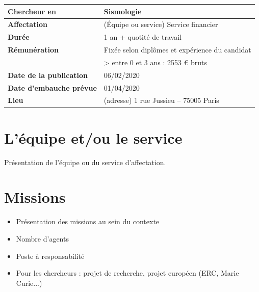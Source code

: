 \documentclass{ipgpoffreemploi}
\begin{document}
\newcommand{\myfoot}{%
Service RH -- Institut de physique du globe de Paris (IPGP) -- UMR 7154 -- 1 rue Jussieu 
-- 75238 Paris Cedex 05 -- France -- www.ipgp.fr}  


\begin{tabularx}{\linewidth}{@{}>{\bfseries\color{IPGPblue}}l@{\hspace*{2cm}}l@{}}
Chercheur en & Sismologie \\ \midrule
Affectation & (Équipe ou service) Service financier\\  \midrule
Durée & 1 an + quotité de travail \\ \midrule
Rémunération & Fixée selon diplômes et expérience du candidat \\ 
& > entre 0 et 3 ans : 2553 \euro{} bruts \\ \midrule
Date de la publication & 06/02/2020\\ \midrule
Date d’embauche prévue & 01/04/2020\\ \midrule
Lieu &  (adresse) 1 rue Jussieu -- 75005 Paris\\ \bottomrule
\end{tabularx}

\presIPGP

\section*{L’équipe et/ou le service}

Présentation de l’équipe ou du service d’affectation.

\section*{Missions}

\begin{itemize}
\item Présentation des missions au sein du contexte
\item Nombre d’agents
\item Poste à responsabilité
\item Pour les chercheurs : projet de recherche, projet européen (ERC, Marie Curie...)
\end{itemize}
\end{document}
